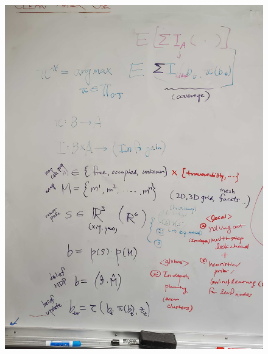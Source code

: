 \documentclass[letterpaper, 10 pt, conference]{ieeeconf}  %
\begin{document}
\clearpage
\begin{figure}[H]
  \centering
  \includegraphics[width=.9\textwidth]{figures/whiteboardI.jpg}
\end{figure}
\clearpage
\end{document}
